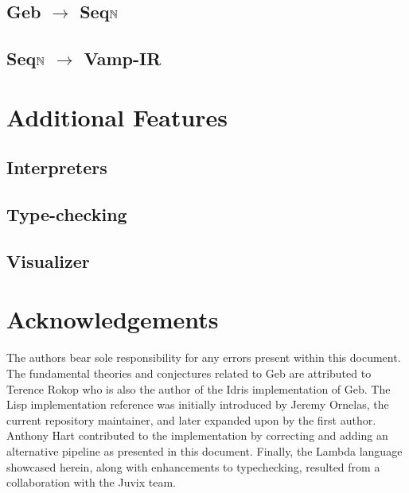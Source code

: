 \subsection{Geb $\to$ Seq$\mathbb{N}$}
\subsection{Seq$\mathbb{N}$ $\to$ Vamp-IR}

\section{Additional Features}
\subsection{Interpreters}
\subsection{Type-checking}
\subsection{Visualizer}

\section*{Acknowledgements}
The authors bear sole responsibility for any errors present within this
document. The fundamental theories and conjectures related to Geb are
attributed to Terence Rokop who is also the author of the Idris implementation of Geb. The Lisp implementation reference was
initially introduced by Jeremy Ornelas, the current repository maintainer,
and later expanded upon by the first author. Anthony Hart contributed to
the implementation by correcting and adding an alternative pipeline as
presented in this document. Finally, the Lambda language showcased herein,
along with enhancements to typechecking, resulted from a collaboration with
the Juvix team.
\nocite{*}



